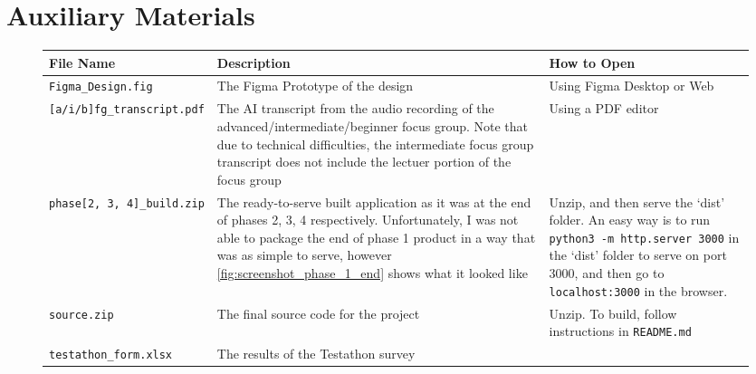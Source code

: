 \chapter{Auxiliary Materials}
\label{appx:additional_mats}
\begin{figure}[h]
    \centering
    \begin{tabular}{|m{5cm}|p{5cm}|>{\raggedright\arraybackslash}p{5.5cm}|}
        \hline\textbf{File Name} & \textbf{Description} & \textbf{How to Open} \\[1ex] \hline\vspace{1ex}
        \verb|Figma_Design.fig| & The Figma Prototype of the design & Using Figma Desktop or Web\\[1ex] \hline\vspace{1ex}

        \verb|[a/i/b]fg_transcript.pdf| & The AI transcript from the audio recording of the advanced/intermediate/beginner focus group. Note that due to technical difficulties, the intermediate focus group transcript does not include the lectuer portion of the focus group & Using a PDF editor \\[1ex] \hline\vspace{1ex}

        \verb|phase[2, 3, 4]_build.zip| & The ready-to-serve built application as it was at the end of phases 2, 3, 4 respectively. Unfortunately, I was not able to package the end of phase 1 product in a way that was as simple to serve, however \ref{fig:screenshot_phase_1_end} shows what it looked like & Unzip, and then serve the `dist' folder. An easy way is to run \verb|python3 -m http.server 3000| in the `dist' folder to serve on port 3000, and then go to \verb|localhost:3000| in the browser. \\[1ex]\hline\vspace{1ex}

        \verb|source.zip| & The final source code for the project & Unzip. To build, follow instructions in \verb|README.md| \\[1ex] \hline\vspace{1ex}

        \verb|testathon_form.xlsx| & The results of the Testathon survey & \ \\ \hline
    \end{tabular}
\end{figure}

